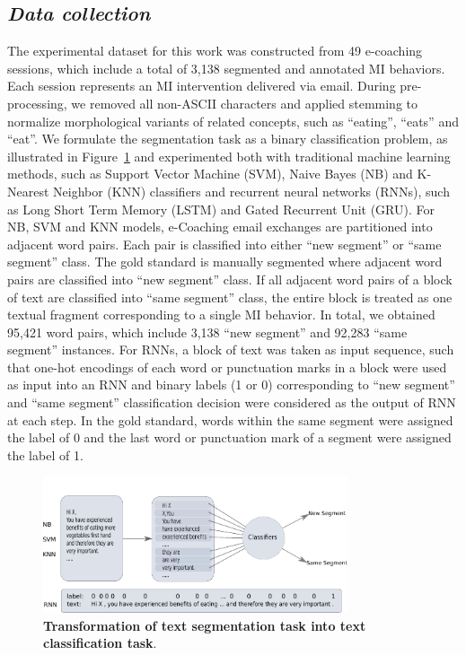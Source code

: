 \documentclass{amia}
\begin{document}
\subsection*{\textit{Data collection}}
The experimental dataset for this work was constructed from 49 e-coaching sessions, which include a total of 3,138 segmented and annotated MI behaviors. Each session represents an MI intervention delivered via email. During pre-processing, we removed all non-ASCII characters and applied stemming to normalize morphological variants of related concepts, such as ``eating'', ``eats'' and ``eat''. We formulate the segmentation task as a binary classification problem, as illustrated in Figure~\ref{fig:classifier} and experimented both with traditional machine learning methods, such as Support Vector Machine (SVM), Naive Bayes (NB) and K-Nearest Neighbor (KNN) classifiers and recurrent neural networks (RNNs), such as Long Short Term Memory (LSTM) and Gated Recurrent Unit (GRU). For NB, SVM and KNN models, e-Coaching email exchanges are partitioned into adjacent word pairs. Each pair is classified into either ``new segment'' or ``same segment'' class. The gold standard is manually segmented where adjacent word pairs are classified into ``new segment'' class. If all adjacent word pairs of a block of text are classified into ``same segment'' class, the entire block is treated as one textual fragment corresponding to a single MI behavior. In total, we obtained 95,421 word pairs, which include 3,138 ``new segment'' and 92,283 ``same segment'' instances. For RNNs, a block of text was taken as input sequence, such that one-hot encodings of each word or punctuation marks in a block were used as input into an RNN and binary labels (1 or 0) corresponding to ``new segment'' and ``same segment'' classification decision were considered as the output of RNN at each step. In the gold standard, words within the same segment were assigned the label of 0 and the last word or punctuation mark of a segment were assigned the label of 1.    

\begin{figure}[!htb]
    \centering
    \includegraphics[width=0.80\textwidth]{figures/classifier.pdf}
    \caption{\textbf{Transformation of text segmentation task into text classification task}.}
    \label{fig:classifier}
\end{figure}
\end{document}
